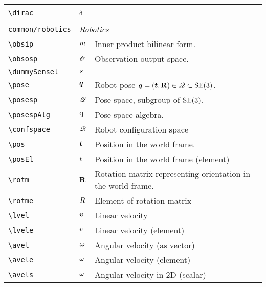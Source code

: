 \begin{longtable}{lll}
{{}%
}%
\\ 
 {\color[rgb]{0.5,0.5,0.5}\texttt{\textbackslash dirac}} & $\delta$ & \\ 
  &  & \\ 
 {\color[rgb]{0.5,0.5,0.5}\texttt{common/robotics}} & \multicolumn{2}{l}{\emph{Robotics}}\\ 
 \hline
{\color[rgb]{0.5,0.5,0.5}\texttt{\textbackslash obsip}} & $m$ &  Inner product bilinear form.\\ 
 {\color[rgb]{0.5,0.5,0.5}\texttt{\textbackslash obsosp}} & $\mathscr{O}$ &  Observation output space.\\ 
 {\color[rgb]{0.5,0.5,0.5}\texttt{\textbackslash dummySensel}} & $s$ & \\ 
 {\color[rgb]{0.5,0.5,0.5}\texttt{\textbackslash pose}} & $\boldsymbol{q}$ &  Robot pose $\boldsymbol{q} = (\boldsymbol{t}, \mathbf{R}) \in \mathscr{Q} \subset \mathrm{SE(3)}$.\\ 
 {\color[rgb]{0.5,0.5,0.5}\texttt{\textbackslash posesp}} & $\mathscr{Q}$ &  Pose space, subgroup of $\mathrm{SE(3)}$.\\ 
 {\color[rgb]{0.5,0.5,0.5}\texttt{\textbackslash posespAlg}} & $\text{q}$ &  Pose space algebra.\\ 
 {\color[rgb]{0.5,0.5,0.5}\texttt{\textbackslash confspace}} & $\mathscr{Q}$ &  Robot configuration space\\ 
 {\color[rgb]{0.5,0.5,0.5}\texttt{\textbackslash pos}} & $\boldsymbol{t}$ &  Position in the world frame.\\ 
 {\color[rgb]{0.5,0.5,0.5}\texttt{\textbackslash posEl}} & $t$ &  Position in the world frame (element)\\ 
 {\color[rgb]{0.5,0.5,0.5}\texttt{\textbackslash rotm}} & $\mathbf{R}$ &  Rotation matrix representing orientation in the world frame.\\ 
 {\color[rgb]{0.5,0.5,0.5}\texttt{\textbackslash rotme}} & $R$ &  Element of rotation matrix\\ 
 {\color[rgb]{0.5,0.5,0.5}\texttt{\textbackslash lvel}} & $\boldsymbol{v}$ &  Linear velocity\\ 
 {\color[rgb]{0.5,0.5,0.5}\texttt{\textbackslash lvele}} & $v$ &  Linear velocity (element)\\ 
 {\color[rgb]{0.5,0.5,0.5}\texttt{\textbackslash avel}} & $\boldsymbol{\omega}$ &  Angular velocity (as vector)\\ 
 {\color[rgb]{0.5,0.5,0.5}\texttt{\textbackslash avele}} & $\omega$ &  Angular velocity (element)\\ 
 {\color[rgb]{0.5,0.5,0.5}\texttt{\textbackslash avels}} & $\omega$ &  Angular velocity in 2D (scalar)\\ 

\end{longtable}
